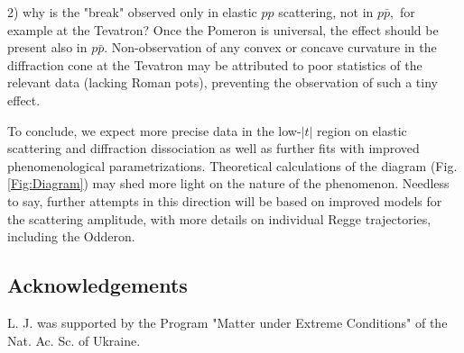 \documentclass[aps,prd,superscriptaddress,showpacs,preprintnumbers]{revtex4}
\begin{document}
2) why is the "break" observed only in elastic $pp$ scattering, not in $p\bar p,$ for example at the Tevatron? Once the Pomeron is universal, the effect should be present also in $p\bar p$. Non-observation of any convex or concave curvature in the diffraction cone at the Tevatron may be attributed to poor statistics of the relevant data (lacking Roman pots), preventing the observation of such a tiny effect.

To conclude, we expect more precise data in the low-$|t|$ region on elastic scattering and diffraction dissociation as well as further fits with improved phenomenological parametrizations. Theoretical calculations of the diagram (Fig. \ref{Fig:Diagram}) may shed more light on the nature of the phenomenon. Needless to say, further attempts in this direction will be based on improved models for the scattering amplitude, with more details on individual Regge trajectories, including the Odderon. 

\subsection*{Acknowledgements}
L. J. was supported by the Program "Matter under Extreme Conditions" of the Nat. Ac. Sc. of Ukraine. 
\end{document}
